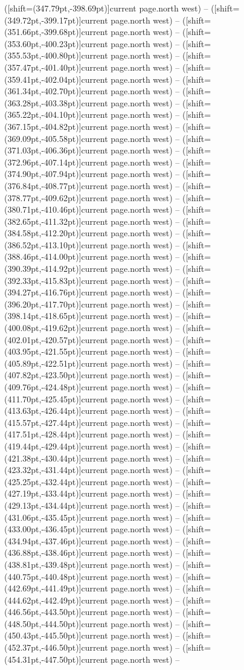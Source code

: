 \documentclass[11pt]{article}
\begin{document}
([shift={(347.79pt,-398.69pt)}]current page.north west) -- ([shift={(349.72pt,-399.17pt)}]current page.north west) -- ([shift={(351.66pt,-399.68pt)}]current page.north west) -- ([shift={(353.60pt,-400.23pt)}]current page.north west) -- ([shift={(355.53pt,-400.80pt)}]current page.north west) -- ([shift={(357.47pt,-401.40pt)}]current page.north west) -- ([shift={(359.41pt,-402.04pt)}]current page.north west) -- ([shift={(361.34pt,-402.70pt)}]current page.north west) -- ([shift={(363.28pt,-403.38pt)}]current page.north west) -- ([shift={(365.22pt,-404.10pt)}]current page.north west) -- ([shift={(367.15pt,-404.82pt)}]current page.north west) -- ([shift={(369.09pt,-405.58pt)}]current page.north west) -- ([shift={(371.03pt,-406.36pt)}]current page.north west) -- ([shift={(372.96pt,-407.14pt)}]current page.north west) -- ([shift={(374.90pt,-407.94pt)}]current page.north west) -- ([shift={(376.84pt,-408.77pt)}]current page.north west) -- ([shift={(378.77pt,-409.62pt)}]current page.north west) -- ([shift={(380.71pt,-410.46pt)}]current page.north west) -- ([shift={(382.65pt,-411.32pt)}]current page.north west) -- ([shift={(384.58pt,-412.20pt)}]current page.north west) -- ([shift={(386.52pt,-413.10pt)}]current page.north west) -- ([shift={(388.46pt,-414.00pt)}]current page.north west) -- ([shift={(390.39pt,-414.92pt)}]current page.north west) -- ([shift={(392.33pt,-415.83pt)}]current page.north west) -- ([shift={(394.27pt,-416.76pt)}]current page.north west) -- ([shift={(396.20pt,-417.70pt)}]current page.north west) -- ([shift={(398.14pt,-418.65pt)}]current page.north west) -- ([shift={(400.08pt,-419.62pt)}]current page.north west) -- ([shift={(402.01pt,-420.57pt)}]current page.north west) -- ([shift={(403.95pt,-421.55pt)}]current page.north west) -- ([shift={(405.89pt,-422.51pt)}]current page.north west) -- ([shift={(407.82pt,-423.50pt)}]current page.north west) -- ([shift={(409.76pt,-424.48pt)}]current page.north west) -- ([shift={(411.70pt,-425.45pt)}]current page.north west) -- ([shift={(413.63pt,-426.44pt)}]current page.north west) -- ([shift={(415.57pt,-427.44pt)}]current page.north west) -- ([shift={(417.51pt,-428.44pt)}]current page.north west) -- ([shift={(419.44pt,-429.44pt)}]current page.north west) -- ([shift={(421.38pt,-430.44pt)}]current page.north west) -- ([shift={(423.32pt,-431.44pt)}]current page.north west) -- ([shift={(425.25pt,-432.44pt)}]current page.north west) -- ([shift={(427.19pt,-433.44pt)}]current page.north west) -- ([shift={(429.13pt,-434.44pt)}]current page.north west) -- ([shift={(431.06pt,-435.45pt)}]current page.north west) -- ([shift={(433.00pt,-436.45pt)}]current page.north west) -- ([shift={(434.94pt,-437.46pt)}]current page.north west) -- ([shift={(436.88pt,-438.46pt)}]current page.north west) -- ([shift={(438.81pt,-439.48pt)}]current page.north west) -- ([shift={(440.75pt,-440.48pt)}]current page.north west) -- ([shift={(442.69pt,-441.49pt)}]current page.north west) -- ([shift={(444.62pt,-442.49pt)}]current page.north west) -- ([shift={(446.56pt,-443.50pt)}]current page.north west) -- ([shift={(448.50pt,-444.50pt)}]current page.north west) -- ([shift={(450.43pt,-445.50pt)}]current page.north west) -- ([shift={(452.37pt,-446.50pt)}]current page.north west) -- ([shift={(454.31pt,-447.50pt)}]current page.north west) -- 
\end{document}
